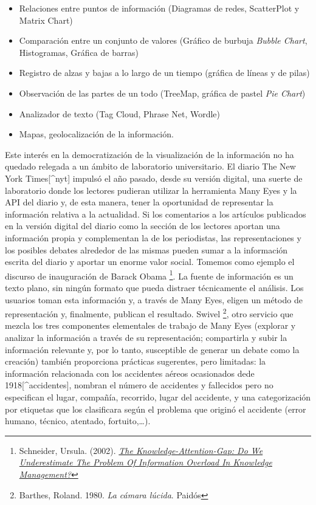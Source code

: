 \documentclass[12pt, a4paper,twoside]{book}
\begin{document}
\begin{itemize}
\item
  Relaciones entre puntos de información (Diagramas de redes,
  ScatterPlot y Matrix Chart)
\item
  Comparación entre un conjunto de valores (Gráfico de burbuja
  \emph{Bubble Chart}, Histogramas, Gráfica de barras)
\item
  Registro de alzas y bajas a lo largo de un tiempo (gráfica de
  líneas y de pilas)
\item
  Observación de las partes de un todo (TreeMap, gráfica de pastel
  \emph{Pie Chart})
\item
  Analizador de texto (Tag Cloud, Phrase Net, Wordle)
\item
  Mapas, geolocalización de la información.
\end{itemize}
Este interés en la democratización de la visualización de la
información no ha quedado relegada a un ámbito de laboratorio
universitario. El diario The New York Times[\^{}nyt] impulsó el año
pasado, desde su versión digital, una suerte de laboratorio donde
los lectores pudieran utilizar la herramienta Many Eyes y la API
del diario y, de esta manera, tener la oportunidad de representar
la información relativa a la actualidad. Si los comentarios a los
artículos publicados en la versión digital del diario como la
sección de los lectores aportan una información propia y
complementan la de los periodistas, las representaciones y los
posibles debates alrededor de las mismas pueden sumar a la
información escrita del diario y aportar un enorme valor social.
Tomemos como ejemplo el discurso de inauguración de Barack Obama%
\footnote{Schneider, Ursula. (2002).
\emph{\href{http://www.jucs.org/jucs_8_5/the_knowledge_attention_gap/Schneider_U.html}{The Knowledge-Attention-Gap: Do We Underestimate The Problem Of Information Overload In Knowledge Management?}}}.
La fuente de información es un texto plano, sin ningún formato que
pueda distraer técnicamente el análisis. Los usuarios toman esta
información y, a través de Many Eyes, eligen un método de
representación y, finalmente, publican el resultado. Swivel%
\footnote{Barthes, Roland. 1980. \emph{La cámara lúcida}. Paidós},
otro servicio que mezcla los tres componentes elementales de
trabajo de Many Eyes (explorar y analizar la información a través
de su representación; compartirla y subir la información relevante
y, por lo tanto, susceptible de generar un debate como la creación)
también proporciona prácticas sugerentes, pero limitadas: la
información relacionada con los accidentes aéreos ocasionados dede
1918[\^{}accidentes], nombran el número de accidentes y fallecidos
pero no especifican el lugar, compañía, recorrido, lugar del
accidente, y una categorización por etiquetas que los clasificara
según el problema que originó el accidente (error humano, técnico,
atentado, fortuito,\ldots{}).
\end{document}
